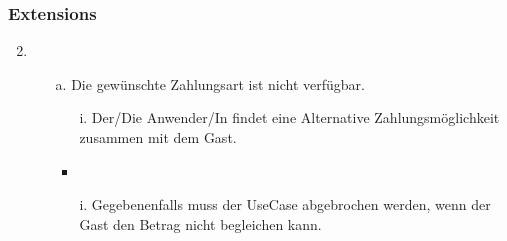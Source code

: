 \documentclass[./detailed_overview_usecases.tex]{subfiles}
\begin{document}
    \subsubsection*{Extensions}
    \begin{enumerate}
        \setcounter{enumi}{1}
        \item \begin{itemize}
                  \item[a.] Die gewünschte Zahlungsart ist nicht verfügbar.
                  \begin{itemize}
                      \item[i.] Der/Die Anwender/In findet eine Alternative Zahlungsmöglichkeit zusammen mit dem Gast.
                  \end{itemize}
                  \begin{itemize}
                      \item \item[i.] Gegebenenfalls muss der UseCase abgebrochen werden, wenn der Gast den Betrag nicht begleichen kann.
                  \end{itemize}
        \end{itemize}
    \end{enumerate}
\end{document}

